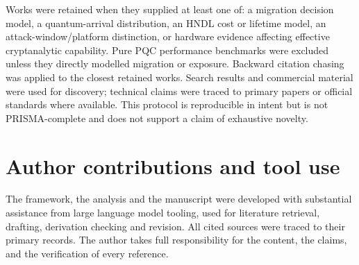 \documentclass[10pt]{article}
\begin{document}
Works were retained when they supplied at least one of: a migration decision model, a quantum-arrival distribution, an HNDL cost or lifetime model, an attack-window/platform distinction, or hardware evidence affecting effective cryptanalytic capability. Pure PQC performance benchmarks were excluded unless they directly modelled migration or exposure. Backward citation chasing was applied to the closest retained works. Search results and commercial material were used for discovery; technical claims were traced to primary papers or official standards where available. This protocol is reproducible in intent but is not PRISMA-complete and does not support a claim of exhaustive novelty.

\section{Author contributions and tool use}

The framework, the analysis and the manuscript were developed with substantial assistance from large language model tooling, used for literature retrieval, drafting, derivation checking and revision. All cited sources were traced to their primary records. The author takes full responsibility for the content, the claims, and the verification of every reference.
\end{document}
